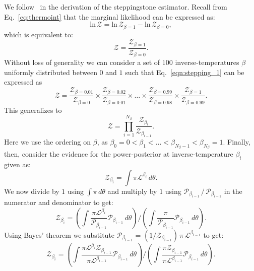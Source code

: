 We follow~\cite{annis2019thermodynamic} in the derivation of the steppingstone estimator. Recall from Eq.~\ref{eq:thermoint} that the marginal likelihood can be expressed as:
\begin{equation}
    \mathrm{ln} \, \mathcal{Z} = \mathrm{ln} \, \mathcal{Z}_{\beta=1} - \mathrm{ln} \, \mathcal{Z}_{\beta=0},
\end{equation}
which is equivalent to:
\begin{equation}\label{eqn:stepping_1}
    \mathcal{Z} = \frac{\mathcal{Z}_{\beta=1}}{\mathcal{Z}_{\beta=0}}.
\end{equation}
Without loss of generality we can consider a set of $100$ inverse-temperatures $\beta$ uniformly distributed between $0$ and $1$ such that Eq.~\ref{eqn:stepping_1} can be expressed as
\begin{equation}
    \mathcal{Z} = \frac{\mathcal{Z}_{\beta = 0.01}} {\mathcal{Z}_{\beta = 0}}  
    \times \frac{\mathcal{Z}_{\beta = 0.02}} {\mathcal{Z}_{\beta = 0.01}}
    \times \ldots \times \frac{\mathcal{Z}_{\beta = 0.99}} {\mathcal{Z}_{\beta = 0.98}} \times \frac{\mathcal{Z}_{\beta = 1}} {\mathcal{Z}_{\beta = 0.99}}.
\end{equation}
This generalizes to
\begin{equation}\label{eqn:ssa_prod_series}
     \mathcal{Z} = \prod_{i=1}^{N_\beta} \frac{\mathcal{Z}_{\beta_{i}}}{\mathcal{Z}_{\beta_{i-1}}}.
\end{equation}
Here we use the ordering on $\beta$, as $\beta_0=0 < \beta_1 < ... < \beta_{N_\beta -1} < \beta_{N_\beta} = 1$. Finally, then, consider the evidence for the power-posterior at inverse-temperature $\beta_i$ given as:
\begin{equation}
    \mathcal{Z}_{\beta_i} = \int \pi \mathcal{L}^{\beta_i} \, d\theta.
\end{equation}
We now divide by $1$ using $\int \pi \, d\theta$ and multiply by $1$ using $\mathcal{P}_{\beta_{i-1}} \, / \, \mathcal{P}_{\beta_{i-1}}$ in the numerator and denominator to get:
\begin{equation}
    \mathcal{Z}_{\beta_i} = \left(\int \frac{\pi \mathcal{L}^{\beta_i}}{\mathcal{P}_{\beta_{i-1}}} \mathcal{P}_{\beta_{i-1}} \, d\theta \right )\bigg / \left( \int \frac{\pi}{\mathcal{P}_{\beta_{i-1}}} \mathcal{P}_{\beta_{i-1}} \, d\theta \right).
\end{equation}
Using Bayes' theorem we substitute $\mathcal{P}_{\beta_{i-1}}$ = $(1/\mathcal{Z}_{\beta_{i-1}}) \, \pi \, \mathcal{L}^{\beta_{i-1}}$ to get:
\begin{equation}
    \mathcal{Z}_{\beta_i} = \left (\int \frac{\pi \mathcal{L}^{\beta_i} \mathcal{Z}_{\beta_{i-1}}}{\pi \mathcal{L}^{\beta_{i-1}}} \mathcal{P}_{\beta_{i-1}} \, d\theta \right) \bigg / \left(\int \frac{\pi \mathcal{Z}_{\beta_{i-1}}}{\pi \mathcal{L}^{\beta_{i-1}}} \mathcal{P}_{\beta_{i-1}} \, d\theta\right).
\end{equation}
